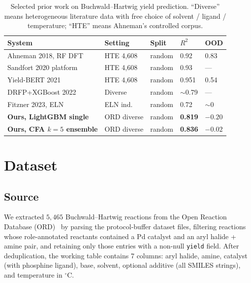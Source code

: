 \documentclass[conference]{IEEEtran}
\begin{document}
\begin{table}[t]
\centering
\caption{Selected prior work on Buchwald--Hartwig yield prediction. ``Diverse''
means heterogeneous literature data with free choice of solvent / ligand /
temperature; ``HTE'' means Ahneman's controlled corpus.}
\label{tab:prior_art}
\setlength{\tabcolsep}{2pt}
\scriptsize
\begin{tabular}{p{2.6cm}p{1.3cm}p{1.3cm}p{0.85cm}p{0.85cm}}
\toprule
\textbf{System} & \textbf{Setting} & \textbf{Split} &
  \textbf{$R^{2}$} & \textbf{OOD} \\
\midrule
Ahneman 2018, RF DFT~\cite{Ahneman2018}    & HTE 4{,}608 & random   & 0.92 & 0.83\\
Sandfort 2020 platform~\cite{Sandfort2020} & HTE 4{,}608 & random   & 0.93 & ---\\
Yield-BERT 2021~\cite{Schwaller2021YB}     & HTE 4{,}608 & random   & 0.951 & 0.54\\
DRFP+XGBoost 2022~\cite{Probst2022}        & Diverse     & random   & $\sim$0.79 & ---\\
Fitzner 2023, ELN~\cite{Fitzner2023}       & ELN ind.    & random   & 0.72 & $\sim$0\\
\midrule
\textbf{Ours, LightGBM single}             & ORD diverse & random   & \textbf{0.819} & $-0.20$\\
\textbf{Ours, CFA $k=5$ ensemble}          & ORD diverse & random   & \textbf{0.836} & $-0.02$\\
\bottomrule
\end{tabular}
\end{table}

\section{Dataset}
\label{sec:dataset}

\subsection{Source}
We extracted $5{,}465$ Buchwald--Hartwig reactions from the Open Reaction
Database (ORD)~\cite{Kearnes2021} by parsing the protocol-buffer dataset
files, filtering reactions whose role-annotated reactants contained a Pd
catalyst and an aryl halide + amine pair, and retaining only those entries
with a non-null \texttt{yield} field. After deduplication, the working
table contains 7 columns: aryl halide, amine, catalyst (with phosphine
ligand), base, solvent, optional additive (all SMILES strings), and
temperature in $^\circ$C.
\end{document}
